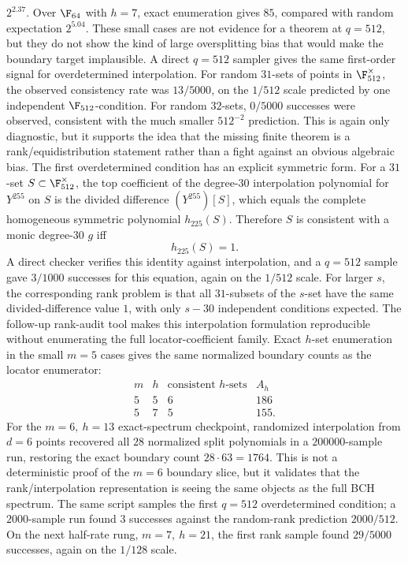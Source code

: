 \(2^{2.37}\).  Over \(\F_{64}\) with \(h=7\), exact enumeration gives \(85\), compared with random expectation
\(2^{5.04}\).  These small cases are not evidence for a theorem at \(q=512\), but they do not show the kind of
large oversplitting bias that would make the boundary target implausible.
A direct \(q=512\) sampler gives the same first-order signal for overdetermined interpolation.  For random \(31\)-sets
of points in \(\F_{512}^\times\), the observed consistency rate was \(13/5000\), on the \(1/512\) scale predicted by
one independent \(\F_{512}\)-condition.  For random \(32\)-sets, \(0/5000\) successes were observed, consistent with
the much smaller \(512^{-2}\) prediction.  This is again only diagnostic, but it supports the idea that the missing
finite theorem is a rank/equidistribution statement rather than a fight against an obvious algebraic bias.
The first overdetermined condition has an explicit symmetric form.  For a \(31\)-set \(S\subset\F_{512}^\times\), the
top coefficient of the degree-\(30\) interpolation polynomial for \(Y^{255}\) on \(S\) is the divided difference
\((Y^{255})[S]\), which equals the complete homogeneous symmetric polynomial \(h_{225}(S)\).  Therefore \(S\) is
consistent with a monic degree-\(30\) \(g\) iff
\[
h_{225}(S)=1.
\]
A direct checker verifies this identity against interpolation, and a \(q=512\) sample gave \(3/1000\) successes for
this equation, again on the \(1/512\) scale.  For larger \(s\), the corresponding rank problem is that all \(31\)-subsets
of the \(s\)-set have the same divided-difference value \(1\), with only \(s-30\) independent conditions expected.
The follow-up rank-audit tool makes this interpolation formulation reproducible without enumerating the full
locator-coefficient family.  Exact \(h\)-set enumeration in the small \(m=5\) cases gives the same normalized boundary
counts as the locator enumerator:
\[
\begin{array}{c|c|c|c}
m & h & \text{consistent }h\text{-sets} & A_h\\
\hline
5 & 5 & 6 & 186\\
5 & 7 & 5 & 155 .
\end{array}
\]
For the \(m=6,\ h=13\) exact-spectrum checkpoint, randomized interpolation from \(d=6\) points recovered all
\(28\) normalized split polynomials in a \(200000\)-sample run, restoring the exact boundary count
\(28\cdot63=1764\).  This is not a deterministic proof of the \(m=6\) boundary slice, but it validates that the
rank/interpolation representation is seeing the same objects as the full BCH spectrum.  The same script samples the
first \(q=512\) overdetermined condition; a \(2000\)-sample run found \(3\) successes against the random-rank prediction
\(2000/512\).  On the next half-rate rung, \(m=7,\ h=21\), the first rank sample found \(29/5000\) successes, again on
the \(1/128\) scale.

